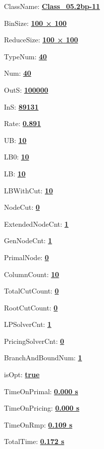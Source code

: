 \documentclass[11pt]{article}
\begin{document}
\pagestyle{empty}


ClassName: \underline{\textbf{Class_05.2bp-11}}
\par
BinSize: \underline{\textbf{100 × 100}}
\par
ReduceSize: \underline{\textbf{100 × 100}}
\par
TypeNum: \underline{\textbf{40}}
\par
Num: \underline{\textbf{40}}
\par
OutS: \underline{\textbf{100000}}
\par
InS: \underline{\textbf{89131}}
\par
Rate: \underline{\textbf{0.891}}
\par
UB: \underline{\textbf{10}}
\par
LB0: \underline{\textbf{10}}
\par
LB: \underline{\textbf{10}}
\par
LBWithCut: \underline{\textbf{10}}
\par
NodeCut: \underline{\textbf{0}}
\par
ExtendedNodeCnt: \underline{\textbf{1}}
\par
GenNodeCnt: \underline{\textbf{1}}
\par
PrimalNode: \underline{\textbf{0}}
\par
ColumnCount: \underline{\textbf{10}}
\par
TotalCutCount: \underline{\textbf{0}}
\par
RootCutCount: \underline{\textbf{0}}
\par
LPSolverCnt: \underline{\textbf{1}}
\par
PricingSolverCnt: \underline{\textbf{0}}
\par
BranchAndBoundNum: \underline{\textbf{1}}
\par
isOpt: \underline{\textbf{true}}
\par
TimeOnPrimal: \underline{\textbf{0.000 s}}
\par
TimeOnPricing: \underline{\textbf{0.000 s}}
\par
TimeOnRmp: \underline{\textbf{0.109 s}}
\par
TotalTime: \underline{\textbf{0.172 s}}
\par
\newpage


\end{document}
